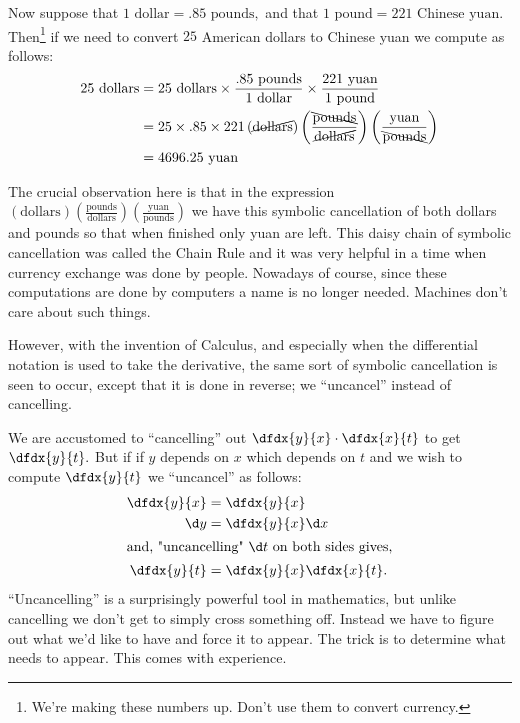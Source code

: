 Now  suppose that $1 \text{ dollar}=.85\text{ pounds},$ and that $1 \text{ pound} = 221 \text{ Chinese yuan}.$ Then\footnote{We're making these numbers up. Don't use them to convert
currency.} if we
need to convert $25$ American dollars to Chinese yuan we compute as follows:
\begin{align*}
  25\text{ dollars} &= 25\text{ dollars}\times \frac{.85\text{ 
                      pounds}}{1 \text{ dollar}}\times \frac{221
                      \text{ 
                      yuan}}{1 \text{ pound}}\\
                    &= 25\times.85\times221\left(\text{\cancel{dollars}}\right)
                      \left(\frac{\text{\bcancel{pounds}}}{\text{\cancel{dollars}}}\right)
                      \left(\frac{\text{yuan}}{\text{\bcancel{pounds}}}\right)  \\
                    &= 4696.25 \text{ yuan}  
\end{align*}

The crucial observation here is that in the expression
$\left(\text{dollars}\right)
\left(\frac{\text{pounds}}{\text{dollars}}\right)
\left(\frac{\text{yuan}}{\text{pounds}}\right) $ we have this symbolic
cancellation of both dollars and pounds so that when finished only
yuan are left.  This daisy chain of symbolic cancellation was called
the Chain Rule and it was very helpful in a time when currency
exchange was done by people. Nowadays of course, since these computations
are done by computers a name is  no longer needed. Machines don't
care about such things.

However, with the invention of Calculus, and especially when the
differential notation is used to take the derivative, the same sort of
symbolic cancellation is seen to occur, except that it is done in
reverse; we ``uncancel'' instead of cancelling.  

We are accustomed to ``cancelling'' out $\dfdx{y}{x}\cdot\dfdx{x}{t}$
to get $\dfdx{y}{t}.$ But if if $y$ depends on $x$ which depends on
$t$ and we wish to compute $\dfdx{y}{t}$ we ``uncancel'' as follows:
\begin{align*}
  \dfdx{y}{x}        &=   \dfdx{y}{x}\\
        \d y  &= \dfdx{y}{x}\d x\\
\intertext{and, "uncancelling" $\d t$ on both sides gives,}
  \dfdx{y}{t} &= \dfdx{y}{x}\dfdx{x}{t}.\\
\end{align*}
``Uncancelling'' is a surprisingly powerful tool in mathematics, but
unlike cancelling we don't get to simply cross something off. Instead
we have to figure out what we'd like to have and force it to appear.
The trick is to determine what needs to appear. This comes with
experience.

